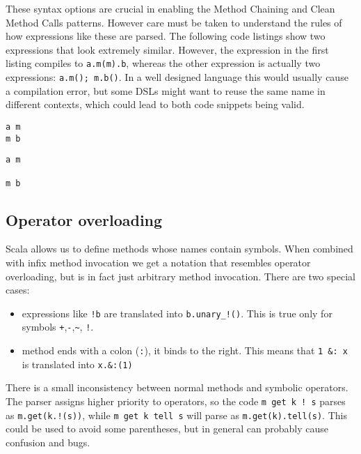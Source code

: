 These syntax options are crucial in enabling the Method Chaining and Clean Method Calls patterns. However care must be taken to understand the rules of how expressions like these are parsed. The following code listings show two expressions that look extremely similar. However, the expression in the first listing compiles to \texttt{a.m(m).b}, whereas the other expression is actually two expressions: \texttt{a.m(); m.b()}. In a well designed language this would usually cause a compilation error, but some DSLs might want to reuse the same name in different contexts, which could lead to both code snippets being valid.

\begin{minipage}[t]{0.4\textwidth}
\begin{lstlisting}[caption=One expression]
a m
m b
\end{lstlisting}
\end{minipage}
\hfill
\begin{minipage}[t]{0.4\textwidth}
\begin{lstlisting}[caption=Two expressions]
a m

m b
\end{lstlisting}
\end{minipage}

\subsection{Operator overloading}

Scala allows us to define methods whose names contain symbols. When combined with infix method invocation we get a notation that resembles operator overloading, but is in fact just arbitrary method invocation. There are two special cases: 
\begin{itemize}
	\item expressions like \texttt{!b} are translated into \texttt{b.unary\_!()}. This is true only for symbols \texttt{+},\texttt{-},\texttt{\~}, \texttt{!}.
	\item method ends with a colon (\texttt{:}), it binds to the right. This means that \texttt{1 \&: x} is translated into \texttt{x.\&:(1)}
\end{itemize}

There is a small inconsistency between normal methods and symbolic operators. The parser assigns higher priority to operators, so the code \texttt{m get k ! s} parses as \texttt{m.get(k.!(s))}, while \texttt{m get k tell s} will parse as \texttt{m.get(k).tell(s)}. This could be used to avoid some parentheses, but in general can probably cause confusion and bugs.

